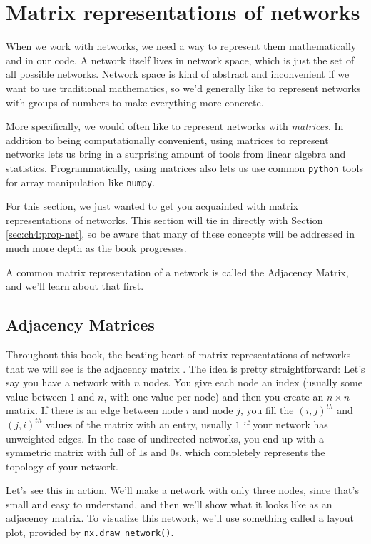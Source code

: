 \section{Matrix representations of networks}
\label{sec:ch4:mtx-rep}

When we work with networks, we need a way to represent them mathematically and in our code. A network itself lives in network space, which is just the set of all possible networks. Network space is kind of abstract and inconvenient if we want to use traditional mathematics, so we'd generally like to represent networks with groups of numbers to make everything more concrete.

More specifically, we would often like to represent networks with \emph{matrices}. In addition to being computationally convenient, using matrices to represent networks lets us bring in a surprising amount of tools from linear algebra and statistics. Programmatically, using matrices also lets us use common \texttt{python} tools for array manipulation like \texttt{numpy}.

For this section, we just wanted to get you acquainted with matrix representations of networks. This section will tie in directly with Section \ref{sec:ch4:prop-net}, so be aware that many of these concepts will be addressed in much more depth as the book progresses.

A common matrix representation of a network is called the Adjacency Matrix, and we'll learn about that first.

\subsection{Adjacency Matrices}

Throughout this book, the beating heart of matrix representations of networks that we will see is the adjacency matrix \cite{Godsil}. The idea is pretty straightforward: Let's say you have a network with $n$ nodes. You give each node an index (usually some value between $1$ and $n$, with one value per node) and then you create an $n \times n$ matrix. If there is an edge between node $i$ and node $j$, you fill the $(i, j)^{th}$ and $(j, i)^{th}$ values of the matrix with an entry, usually $1$ if your network has unweighted edges. In the case of undirected networks, you end up with a symmetric matrix with full of $1$s and $0$s, which completely represents the topology of your network.

Let's see this in action. We'll make a network with only three nodes, since that's small and easy to understand, and then we'll show what it looks like as an adjacency matrix. To visualize this network, we'll use something called a layout plot, provided by \texttt{nx.draw\_network()}.

